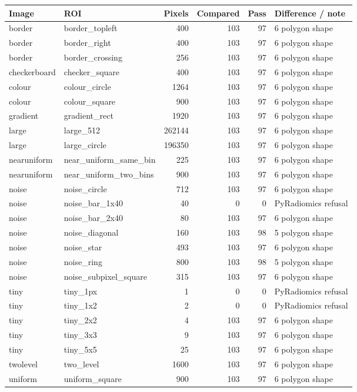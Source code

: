 \begin{tabular}{llrrrp{4.0cm}}
\toprule
Image & ROI & Pixels & Compared & Pass & Difference / note \\
\midrule
border & border\_topleft & 400 & 103 & 97 & 6 polygon shape \\
border & border\_right & 400 & 103 & 97 & 6 polygon shape \\
border & border\_crossing & 256 & 103 & 97 & 6 polygon shape \\
checkerboard & checker\_square & 400 & 103 & 97 & 6 polygon shape \\
colour & colour\_circle & 1264 & 103 & 97 & 6 polygon shape \\
colour & colour\_square & 900 & 103 & 97 & 6 polygon shape \\
gradient & gradient\_rect & 1920 & 103 & 97 & 6 polygon shape \\
large & large\_512 & 262144 & 103 & 97 & 6 polygon shape \\
large & large\_circle & 196350 & 103 & 97 & 6 polygon shape \\
nearuniform & near\_uniform\_same\_bin & 225 & 103 & 97 & 6 polygon shape \\
nearuniform & near\_uniform\_two\_bins & 900 & 103 & 97 & 6 polygon shape \\
noise & noise\_circle & 712 & 103 & 97 & 6 polygon shape \\
noise & noise\_bar\_1x40 & 40 & 0 & 0 & PyRadiomics refusal \\
noise & noise\_bar\_2x40 & 80 & 103 & 97 & 6 polygon shape \\
noise & noise\_diagonal & 160 & 103 & 98 & 5 polygon shape \\
noise & noise\_star & 493 & 103 & 97 & 6 polygon shape \\
noise & noise\_ring & 800 & 103 & 98 & 5 polygon shape \\
noise & noise\_subpixel\_square & 315 & 103 & 97 & 6 polygon shape \\
tiny & tiny\_1px & 1 & 0 & 0 & PyRadiomics refusal \\
tiny & tiny\_1x2 & 2 & 0 & 0 & PyRadiomics refusal \\
tiny & tiny\_2x2 & 4 & 103 & 97 & 6 polygon shape \\
tiny & tiny\_3x3 & 9 & 103 & 97 & 6 polygon shape \\
tiny & tiny\_5x5 & 25 & 103 & 97 & 6 polygon shape \\
twolevel & two\_level & 1600 & 103 & 97 & 6 polygon shape \\
uniform & uniform\_square & 900 & 103 & 97 & 6 polygon shape \\
\bottomrule
\end{tabular}

